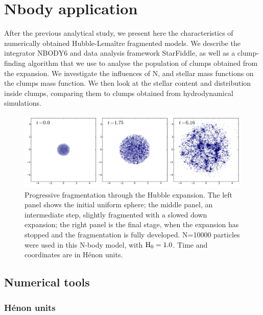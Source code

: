 

\chapter{Nbody application}
\label{Chap:nbody}

After the previous analytical study, we present here the characteristics of numerically obtained Hubble-Lema\^itre fragmented models. We describe the integrator NBODY6 and data analysis framework StarFiddle, as well as a clump-finding algorithm that we use to analyse the population of clumps obtained from the expansion. We investigate the influences of N, \tHub and stellar mass functions on the clumps mass function. We then look at the stellar content and distribution inside clumps, comparing them to clumps obtained from hydrodynamical simulations.


\minitoc



\begin{figure}
\begin{center}
\includegraphics[width=\textwidth]{Figures/2_fragmentation}
\caption[Fragmentation of a \HubLem model]{Progressive fragmentation through the Hubble expansion. The left panel shows the initial uniform sphere; the middle panel, an intermediate step, slightly fragmented with a slowed down expansion; the right panel is the final stage, when the expansion has stopped and the fragmentation is fully developed. N=10000 particles were used in this N-body model, with ${\textrm{H}}_0 = 1.0$. Time and coordinates are in H\'enon units.}
\label{Fig:2_fragmentation}
\end{center}
\end{figure}




\section{Numerical tools}

\subsection{H\'enon units}


